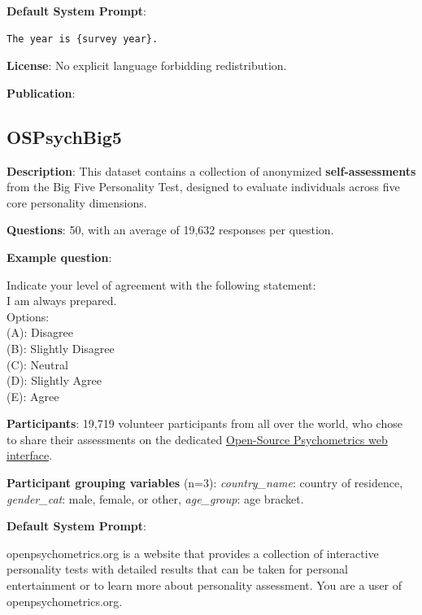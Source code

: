 \documentclass{article} %
\begin{document}
\textbf{Default System Prompt}:
\begin{examplebox}
\begin{Verbatim}[fontfamily=\rmdefault]
The year is {survey year}.
\end{Verbatim}
\end{examplebox}


\textbf{License}: No explicit language forbidding redistribution.

\textbf{Publication}: \cite{afrobarometer2023}


\subsection{OSPsychBig5}

\textbf{Description}: This dataset contains a collection of anonymized \textbf{self-assessments} from the Big Five Personality Test, designed to evaluate individuals across five core personality dimensions.

\textbf{Questions}: 50, with an average of 19,632 responses per question.

\textbf{Example question}:

\begin{examplebox}
    Indicate your level of agreement with the following statement:\\
    I am always prepared.\\
    
    Options:\\
    (A): Disagree\\
    (B): Slightly Disagree\\
    (C): Neutral\\
    (D): Slightly Agree\\
    (E): Agree
\end{examplebox}

\textbf{Participants}: 19,719 volunteer participants from all over the world, who chose to share their assessments on the dedicated \href{https://openpsychometrics.org/tests/IPIP-BFFM/}{Open-Source Psychometrics web interface}.

\textbf{Participant grouping variables} (n=3):
\textit{country\_name}: country of residence,
\textit{gender\_cat}: male, female, or other,
\textit{age\_group}: age bracket.

\textbf{Default System Prompt}:
\begin{examplebox}
openpsychometrics.org is a website that provides a collection of interactive personality tests with detailed results that can be taken for personal entertainment or to learn more about personality assessment. You are a user of openpsychometrics.org.
\end{examplebox}
\end{document}
